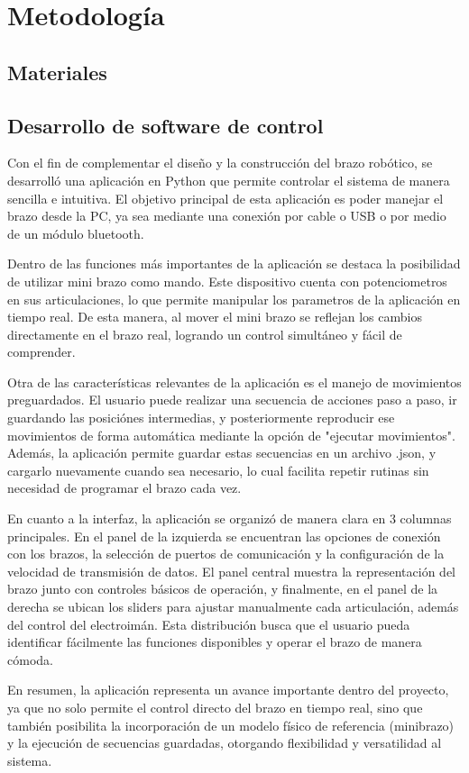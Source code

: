 \section{Metodología}
\subsection{Materiales}
\subsection{Desarrollo de software de control}
Con el fin de complementar el diseño y la construcción del brazo robótico, se desarrolló una aplicación en Python que permite controlar el sistema de manera sencilla e intuitiva. El objetivo principal de esta aplicación es poder manejar el brazo desde la PC, ya sea mediante una conexión por cable o USB o por medio de un módulo bluetooth.

Dentro de las funciones más importantes de la aplicación se destaca la posibilidad de utilizar mini brazo como mando. Este dispositivo cuenta con potenciometros en sus articulaciones, lo que permite manipular los parametros de la aplicación en tiempo real. De esta manera, al mover el mini brazo se reflejan los cambios directamente en el brazo real, logrando un control simultáneo y fácil de comprender.

Otra de las características relevantes de la aplicación es el manejo de movimientos preguardados. El usuario puede realizar una secuencia de acciones paso a paso, ir guardando las posiciónes intermedias, y posteriormente reproducir ese movimientos de forma automática mediante la opción de "ejecutar movimientos". Además, la aplicación permite guardar estas secuencias en un archivo .json, y cargarlo nuevamente cuando sea necesario, lo cual facilita repetir rutinas sin necesidad de programar el brazo cada vez.

En cuanto a la interfaz, la aplicación se organizó de manera clara en 3 columnas principales. En el panel de la izquierda se encuentran las opciones de conexión con los brazos, la selección de puertos de comunicación y la configuración de la velocidad de transmisión de datos. El panel central muestra la representación del brazo junto con controles básicos de operación, y finalmente, en el panel de la derecha se ubican los sliders para ajustar manualmente cada articulación, además del control del electroimán. Esta distribución busca que el usuario pueda identificar fácilmente las funciones disponibles y operar el brazo de manera cómoda.

En resumen, la aplicación representa un avance importante dentro del proyecto, ya que no solo permite el control directo del brazo en tiempo real, sino que también posibilita la incorporación de un modelo físico de referencia (minibrazo) y la ejecución de secuencias guardadas, otorgando flexibilidad y versatilidad al sistema.